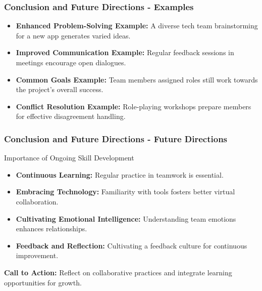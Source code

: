 \documentclass[aspectratio=169]{beamer}
\begin{document}
\begin{frame}[fragile]
    \frametitle{Conclusion and Future Directions - Examples}
    \begin{itemize}
        \item \textbf{Enhanced Problem-Solving Example:} A diverse tech team brainstorming for a new app generates varied ideas.
        \item \textbf{Improved Communication Example:} Regular feedback sessions in meetings encourage open dialogues.
        \item \textbf{Common Goals Example:} Team members assigned roles still work towards the project's overall success.
        \item \textbf{Conflict Resolution Example:} Role-playing workshops prepare members for effective disagreement handling.
    \end{itemize}
\end{frame}

\begin{frame}[fragile]
    \frametitle{Conclusion and Future Directions - Future Directions}
    \begin{block}{Importance of Ongoing Skill Development}
        \begin{itemize}
            \item \textbf{Continuous Learning:} Regular practice in teamwork is essential. 
            \item \textbf{Embracing Technology:} Familiarity with tools fosters better virtual collaboration.
            \item \textbf{Cultivating Emotional Intelligence:} Understanding team emotions enhances relationships.
            \item \textbf{Feedback and Reflection:} Cultivating a feedback culture for continuous improvement.
        \end{itemize}
        \textbf{Call to Action:} Reflect on collaborative practices and integrate learning opportunities for growth.
    \end{block}
\end{frame}
\end{document}
